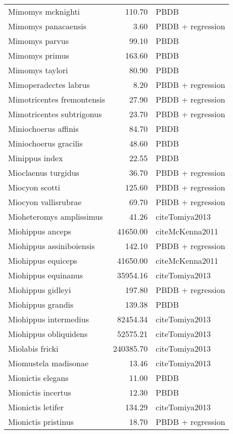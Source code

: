 \begin{table}[ht]
\begin{tabular}{lrl}
  Mimomys mcknighti & 110.70 & PBDB \\ 
  Mimomys panacaensis & 3.60 & PBDB + regression \\ 
  Mimomys parvus & 99.10 & PBDB \\ 
  Mimomys primus & 163.60 & PBDB \\ 
  Mimomys taylori & 80.90 & PBDB \\ 
  Mimoperadectes labrus & 8.20 & PBDB + regression \\ 
  Mimotricentes fremontensis & 27.90 & PBDB + regression \\ 
  Mimotricentes subtrigonus & 23.70 & PBDB + regression \\ 
  Miniochoerus affinis & 84.70 & PBDB \\ 
  Miniochoerus gracilis & 48.60 & PBDB \\ 
  Minippus index & 22.55 & PBDB \\ 
  Mioclaenus turgidus & 36.70 & PBDB + regression \\ 
  Miocyon scotti & 125.60 & PBDB + regression \\ 
  Miocyon vallisrubrae & 69.70 & PBDB + regression \\ 
  Mioheteromys amplissimus & 41.26 & cite{Tomiya2013} \\ 
  Miohippus anceps & 41650.00 & cite{McKenna2011} \\ 
  Miohippus assiniboiensis & 142.10 & PBDB + regression \\ 
  Miohippus equiceps & 41650.00 & cite{McKenna2011} \\ 
  Miohippus equinanus & 35954.16 & cite{Tomiya2013} \\ 
  Miohippus gidleyi & 197.80 & PBDB + regression \\ 
  Miohippus grandis & 139.38 & PBDB \\ 
  Miohippus intermedius & 82454.34 & cite{Tomiya2013} \\ 
  Miohippus obliquidens & 52575.21 & cite{Tomiya2013} \\ 
  Miolabis fricki & 240385.70 & cite{Tomiya2013} \\ 
  Miomustela madisonae & 13.46 & cite{Tomiya2013} \\ 
  Mionictis elegans & 11.00 & PBDB \\ 
  Mionictis incertus & 12.30 & PBDB \\ 
  Mionictis letifer & 134.29 & cite{Tomiya2013} \\ 
  Mionictis pristinus & 18.70 & PBDB + regression \\ 

\end{tabular}
\end{table}
